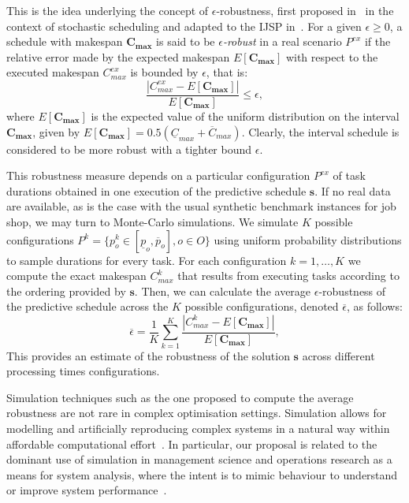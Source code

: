 \documentclass[icae]{iosart2x}
\newcommand{\reviewed}[1]{#1} %
\begin{document}
This is the idea underlying the concept of $\epsilon$-robustness, first proposed in~\cite{Bidot2009} in the context of stochastic scheduling and adapted to the IJSP in~\cite{Diaz2020genetic}. For a given $\epsilon \geq 0$, a schedule with makespan $\mathbf{C_{max}}$ is said to be \emph{$\epsilon$-robust} in a real scenario $P^{ex}$ if the relative error made by the expected makespan $E[\mathbf{C_{max}}]$ with respect to the executed makespan $C_{max}^{ex}$ is bounded by $\epsilon$, that is:
\begin{equation}\label{eqEpsilonRobustness2}
\frac{|C_{max}^{ex}-E[\mathbf{C_{max}}]|}{E[\mathbf{C_{max}}]} \leq \epsilon,
\end{equation}
\reviewed{where $E[\mathbf{C_{max}}]$ is the expected value of the uniform distribution on the interval $\mathbf{C_{max}}$, given by $E[\mathbf{C_{max}}]=0.5(\underline{C}_{max}+\overline{C}_{max})$.} 
Clearly,  the interval schedule is considered to be more robust with a tighter bound $\epsilon$.

This robustness measure depends on a particular configuration $P^{ex}$ of task durations obtained in one execution of the predictive schedule $\boldsymbol{s}$. If no real data are available, as is the case with the usual synthetic benchmark instances for job shop, we may turn to Monte-Carlo simulations. We simulate $K$ possible configurations $P^k = \{p_o^{k} \in [\underline{p}_o, \overline{p}_o], o \in O\}$ using uniform probability distributions to sample durations for every task. For each configuration $k=1,\dots,K$ we compute the exact makespan $C_{max}^k$ that results from executing tasks according to the ordering provided by $\boldsymbol{s}$. Then, we can calculate the average $\epsilon$-robustness of the predictive schedule across the $K$ possible configurations, denoted $\overline{\epsilon}$, as follows:
\begin{equation}\label{eqMRE}
\overline{\epsilon}=\frac{1}{K}\sum_{k=1}^K \frac{|C_{max}^k-E[\mathbf{C_{max}}]|}{E[\mathbf{C_{max}}]},
\end{equation}
This provides an estimate of the robustness of the solution $\boldsymbol{s}$ across different processing times configurations.

\reviewed{Simulation techniques such as the one proposed to compute the average robustness are not rare in complex optimisation settings. Simulation allows for modelling and artificially reproducing complex systems in a natural way within affordable computational effort~\cite{Juan2015}.  In particular, our proposal is related to the dominant use of simulation in management science and operations research as a means for system analysis, where the intent is to mimic behaviour to understand or improve system performance~\cite{Nance2002perspectives}. }
\end{document}
